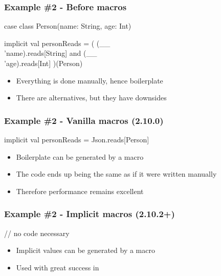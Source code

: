 \documentclass[svgnames,hyperref={bookmarks=false}]{beamer}
\begin{document}
\begin{frame}[fragile]
\frametitle{Example \#2 - Before macros}

\begin{semiverbatim}
case class Person(name: String, age: Int)

implicit val personReads = (
  (__ \\ 'name).reads[String] and
  (__ \\ 'age).reads[Int]
)(Person)

\end{semiverbatim}

\begin{itemize}
\item Everything is done manually, hence boilerplate
\item There are alternatives, but they have downsides
\end{itemize}
\end{frame}

\begin{frame}[fragile]
\frametitle{Example \#2 - Vanilla macros (2.10.0)}

\begin{semiverbatim}
implicit val personReads = Json\alert{.reads[}Person\alert{]}

\end{semiverbatim}

\begin{itemize}
\item Boilerplate can be generated by a macro
\item The code ends up being the same as if it were written manually
\item Therefore performance remains excellent
\end{itemize}
\end{frame}

\begin{frame}[fragile]
\frametitle{Example \#2 - Implicit macros (2.10.2+)}

\begin{semiverbatim}
// no code necessary

\end{semiverbatim}

\begin{itemize}
\item Implicit values can be generated by a macro
\item Used with great success in 
\end{itemize}
\end{frame}
\end{document}
